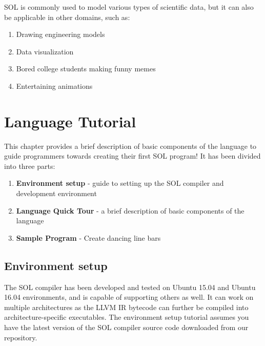\documentclass[letterpaper,12pt]{report}
\begin{document}
  SOL is commonly used to model various types of scientific data, but it can also be applicable in other domains, such as:
  \begin{enumerate}
    \itemsep 0em
    \item Drawing engineering models
    \item Data visualization
    \item Bored college students making funny memes
    \item Entertaining animations
  \end{enumerate}

\chapter{Language Tutorial}
  This chapter provides a brief description of basic components of the language to guide programmers towards creating their first SOL program! It has been divided into three parts:
  \begin{enumerate}
    \item \textbf{Environment setup} - guide to setting up the SOL compiler and development environment
    \item \textbf{Language Quick Tour} - a brief description of basic components of the language
    \item \textbf{Sample Program} - Create dancing line bars
  \end{enumerate}

  \section{Environment setup}
  The SOL compiler has been developed and tested on Ubuntu 15.04 and Ubuntu 16.04 environments, and is capable of supporting others as well. It can work on multiple architectures as the LLVM IR bytecode can further be compiled into architecture-specific executables. The environment setup tutorial assumes you have the latest version of the SOL compiler source code downloaded from our repository.
\end{document}

